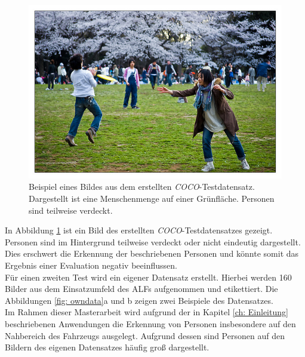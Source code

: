 		\begin{figure}[H]
			\centering
			\includegraphics[width=1\textwidth]{Bilder/coco1.jpg}
			\caption{Beispiel eines Bildes aus dem erstellten \textit{COCO}-Testdatensatz. Dargestellt ist eine Menschenmenge auf einer Grünfläche. Personen sind teilweise verdeckt.}
			\label{fig: cocotest}
		\end{figure}
	
		In Abbildung \ref{fig: cocotest} ist ein Bild des erstellten \textit{COCO}-Testdatensatzes gezeigt. Personen sind im Hintergrund teilweise verdeckt oder nicht eindeutig dargestellt. Dies erschwert die Erkennung der beschriebenen Personen und könnte somit das Ergebnis einer Evaluation negativ beeinflussen. \\ 
		
		Für einen zweiten Test wird ein eigener Datensatz erstellt. Hierbei werden 160 Bilder aus dem Einsatzumfeld des ALFs aufgenommen und etikettiert. Die Abbildungen \ref{fig: owndata}a und b zeigen zwei Beispiele des Datensatzes. \\
		
		Im Rahmen dieser Masterarbeit wird aufgrund der in Kapitel \ref{ch: Einleitung} beschriebenen Anwendungen die Erkennung von Personen insbesondere auf den Nahbereich des Fahrzeugs ausgelegt. Aufgrund dessen sind Personen auf den Bildern des eigenen Datensatzes häufig groß dargestellt.\\
		

